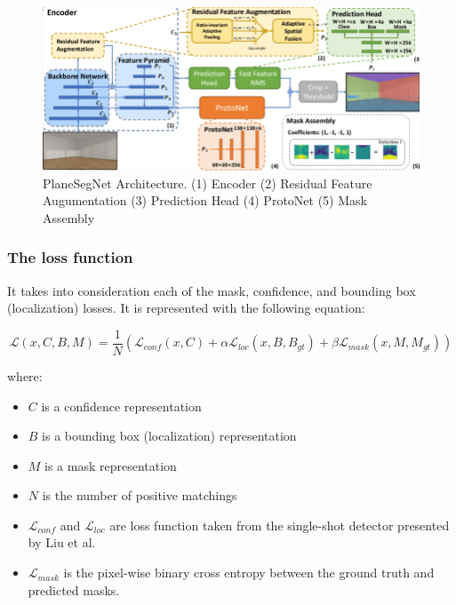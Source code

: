 \begin{figure}[H]
    \centering
    \includegraphics[width=1.0\textwidth]{images/psd/RGB/PlaneSegNetArchitecture.png}
    \caption{PlaneSegNet Architecture. (1) Encoder (2) Residual Feature Augumentation
    (3) Prediction Head (4) ProtoNet (5) Mask Assembly \cite{inproceedingsPlaneSegNet}}
    \label{figure:PlaneSegNet-Architecture}
\end{figure}

\subsubsection{The loss function}

It takes into consideration each of the mask, confidence, and bounding box (localization) losses.
It is represented with the following equation:

\begin{equation} \label{eq:loss-function}
    \mathscr{L}(x,C,B,M) = \frac{1}{N}(\mathscr{L}_{conf}(x,C)
    + \alpha\mathscr{L}_{loc}(x,B,B_{gt})
    + \beta\mathscr{L}_{mask}(x,M,M_{gt}))
\end{equation}

where:
\begin{itemize}
    \item $C$ is a confidence representation
    \item $B$ is a bounding box (localization) representation
    \item $M$ is a mask representation
    \item $N$ is the number of positive matchings
    \item $\mathscr{L}_{conf}$ and $\mathscr{L}_{loc}$ are loss function taken from the single-shot detector
    presented by Liu et al. \cite{inproceedingsSingleShotDetector}
    \item $\mathscr{L}_{mask}$ is the pixel-wise binary cross entropy between the ground truth and predicted masks.
\end{itemize}

